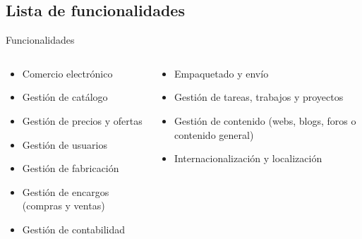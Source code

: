 \subsection{Lista de funcionalidades}
\begin{frame}{Funcionalidades}
\begin{columns}[T]
	\begin{column}{.5\textwidth}
	\begin{itemize}
		\item Comercio electrónico
		\item Gestión de catálogo
		\item Gestión de precios y ofertas
		\item Gestión de usuarios
		\item Gestión de fabricación
		\item Gestión de encargos (compras y ventas)
		\item Gestión de contabilidad
		
	\end{itemize}
\end{column}
	\begin{column}{.5\textwidth}
	\begin{itemize}
		\justifying
		\item Empaquetado y envío
		\item Gestión de tareas, trabajos y proyectos
		\item Gestión de contenido (webs, blogs, foros o contenido general)
		\item Internacionalización y localización
	\end{itemize}
\end{column}
\end{columns}

\end{frame}

